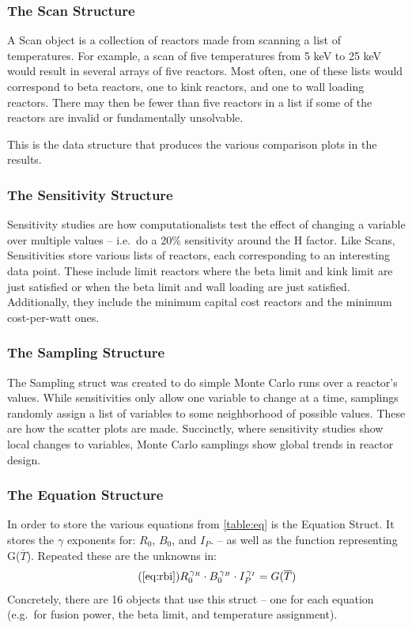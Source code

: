 \subsubsection{The Scan Structure}

A Scan object is a collection of reactors made from scanning a list of temperatures. For example, a scan of five temperatures from 5 keV to 25 keV would result in several arrays of five reactors. Most often, one of these lists would correspond to beta reactors, one to kink reactors, and one to wall loading reactors. There may then be fewer than five reactors in a list if some of the reactors are invalid or fundamentally unsolvable.

This is the data structure that produces the various comparison plots in the results.

\subsubsection{The Sensitivity Structure}

Sensitivity studies are how computationalists test the effect of changing a variable over multiple values -- i.e.\ do a 20\% sensitivity around the H factor. Like Scans, Sensitivities store various lists of reactors, each corresponding to an interesting data point. These include limit reactors where the beta limit and kink limit are just satisfied or when the beta limit and wall loading are just satisfied. Additionally, they include the minimum capital cost reactors and the minimum cost-per-watt ones.

\subsubsection{The Sampling Structure}

The Sampling struct was created to do simple Monte Carlo runs over a reactor's  values. While sensitivities only allow one variable to change at a time, samplings randomly assign a list of variables to some neighborhood of possible values. These are how the scatter plots are made. Succinctly, where sensitivity studies show local changes to variables, Monte Carlo samplings show global trends in reactor design.

\subsubsection{The Equation Structure}

In order to store the various equations from \cref{table:eq} is the Equation Struct. It stores the $\gamma$ exponents for: $R_0$, $B_0$, and $I_P$. -- as well as the function representing G($\overline T$). Repeated these are the unknowns in:
\begin{equation}
	\tag{\ref{eq:rbi}}
	R_0^{\, \gamma_R} \cdot B_0^{\, \gamma_B} \cdot I_P^{\, \gamma_I} = G( \overline T )
\end{equation}
Concretely, there are 16 objects that use this struct -- one for each equation (e.g.\ for fusion power, the beta limit, and temperature assignment).

